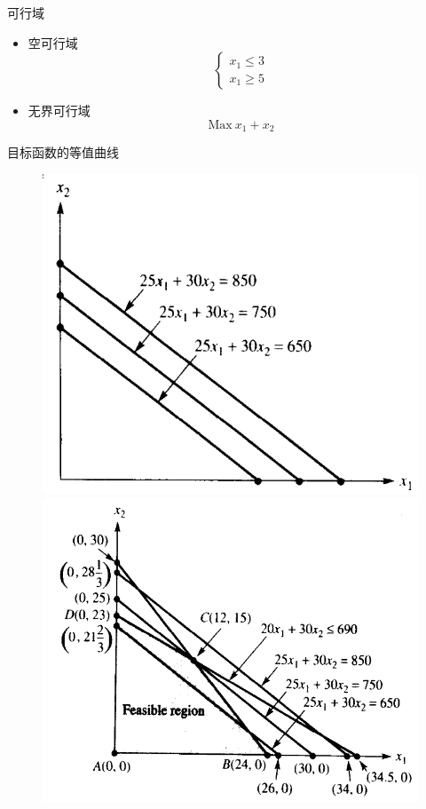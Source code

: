 \documentclass[mathserif, table]{beamer}
\begin{document}
\begin{frame}{可行域}
  \begin{itemize}
  \item 空可行域
    \[
    \left\{
    \begin{array}{l}
      x_1 \le 3\\
      x_1 \ge 5
    \end{array}
    \right.
    \]
  \item 无界可行域
    \[
    \mbox{Max}\ x_1 + x_2
    \]
  \end{itemize}
\end{frame}

\begin{frame}{目标函数的等值曲线}
  \begin{figure}
      \includegraphics[width=.4\textwidth{}]{level.png}
      \includegraphics[width=.5\textwidth{}]{levelcons.png}
  \end{figure}
\end{frame}
\end{document}
